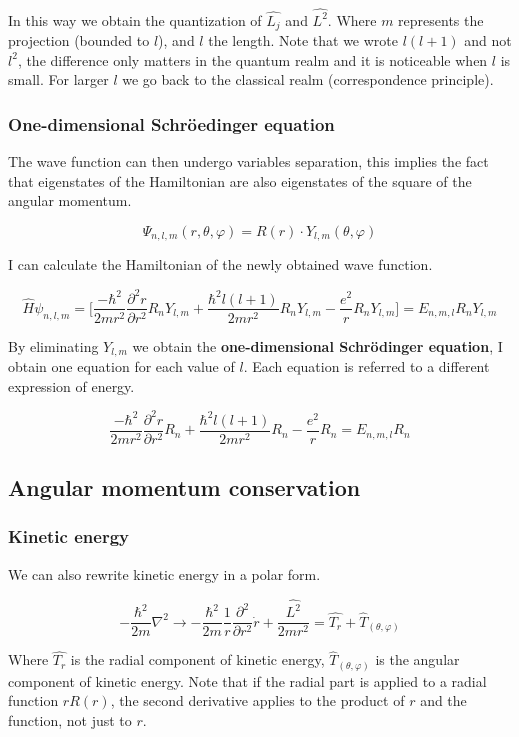 		In this way we obtain the quantization of $\hat{L_j}$ and $\hat{L^2}$.
		Where $m$ represents the projection (bounded to $l$), and $l$ the length.
		Note that we wrote $l(l+1)$ and not $l^2$, the difference only matters in the quantum realm and it is noticeable when $l$ is small.
		For larger $l$ we go back to the classical realm (correspondence principle).

		\subsubsection{One-dimensional Schr\"oedinger equation}
		The wave function can then undergo variables separation, this implies the fact that eigenstates of the Hamiltonian are also eigenstates of the square of the angular momentum.

		$$\Psi_{n,l,m}(r,\theta,\varphi)=R(r)\cdot Y_{l,m}(\theta,\varphi)$$

		I can calculate the Hamiltonian of the newly obtained wave function.

		$$\hat{H}\psi_{n,l,m}=\bigg[\frac{-\hbar^2}{2mr^2}\frac{\partial^2r}{\partial r^2}R_nY_{l,m}+\frac{\hbar^2l(l+1)}{2mr^2}R_nY_{l,m}-\frac{e^2}{r}R_nY_{l,m}\bigg]=E_{n,m,l}R_nY_{l,m}$$

		By eliminating $Y_{l,m}$ we obtain the \textbf{one-dimensional Schr\"odinger equation}, I obtain one equation for each value of $l$.
		Each equation is referred to a different expression of energy.

		$$\frac{-\hbar^2}{2mr^2}\frac{\partial^2r}{\partial r^2}R_n+\frac{\hbar^2l(l+1)}{2mr^2}R_n-\frac{e^2}{r}R_n=E_{n,m,l}R_n$$

	\subsection{Angular momentum conservation}

		\subsubsection{Kinetic energy}
		We can also rewrite kinetic energy in a polar form.

		$$-\frac{\hbar^2}{2m}\nabla^2 \rightarrow-\frac{\hbar^2}{2m}\frac{1}{r}\frac{\partial^2}{\partial r^2}\dot{r}+\frac{\hat{L^2}}{2mr^2} = \hat{T_r}+\hat{T}_{(\theta,\varphi)}$$

		Where $\hat{T_r}$ is the radial component of kinetic energy, $\hat{T}_{(\theta,\varphi)}$ is the angular component of kinetic energy.
		Note that if the radial part is applied to a radial function $rR(r)$, the second derivative applies to the product of $r$ and the function, not just to $r$.

